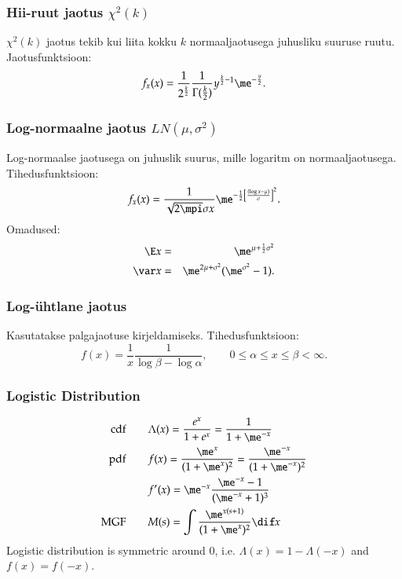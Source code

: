 \documentclass[a4paper]{article}
\numberwithin{equation}{subsection}
\begin{document}
\subsubsection{Hii-ruut jaotus $\chi^2(k)$}
$\chi^2 (k)$ jaotus tekib kui liita kokku $k$ normaaljaotusega
juhusliku suuruse ruutu.  Jaotusfunktsioon:
\begin{equation}
f_x (x) = \frac{1}{2^\frac{k}{2}} \frac{1}{\Gamma(\frac{k}{2})}
  y^{\frac{k}{2} - 1} \me^{-\frac{y}{2}}.
\end{equation}


\subsubsection{Log-normaalne jaotus $LN(\mu,\sigma^2)$}
Log-normaalse jaotusega on juhuslik suurus, mille logaritm on
normaaljaotusega.  Tihedusfunktsioon:
\begin{equation}
f_x (x) = \frac{1}{\sqrt{2\mpi}\sigma x}
  \me^{-\frac{1}{2}\left[\frac{(\log x - \mu)}{\sigma}\right]^2}.
\end{equation}
Omadused:
\begin{eqnarray}
\E x &=& \me^{\mu + \frac{1}{2}\sigma^2}\\
\var x &=& \me^{2\mu + \sigma^2} (\me^{\sigma^2} - 1).
\end{eqnarray}

\subsubsection{Log-ühtlane jaotus}
Kasutatakse palgajaotuse kirjeldamiseks.  Tihedusfunktsioon:
\begin{equation}
  f(x) = \frac{1}{x}\frac{1}{\log \beta - \log \alpha}, \qquad
  0 \le \alpha \le x \le \beta < \infty.
\end{equation}

\subsubsection{Logistic Distribution}
\begin{align}
  \text{cdf}\qquad & \Lambda(x) = \frac{e^x}{1+e^x} = \frac{1}{1 + \me^{-x}}
  \\
  \text{pdf}\qquad & f(x) = \frac{\me^x}{(1 + \me^x)^2} = \frac{\me^{-x}}
  {(1 + \me^{-x})^2}
  \\
  & f'(x) = \me^{-x} \frac{\me^{-x} - 1}{(\me^{-x} + 1)^3}
  \\
  \text{MGF}\qquad &
  M(s) = \int \frac{\me^{x(s+1)}}{(1 + \me^x)^2} \dif x
\end{align}
Logistic distribution is symmetric around 0, i.e. $\Lambda(x) = 1 -
\Lambda(-x)$ and $f(x) = f(-x)$.
\end{document}
